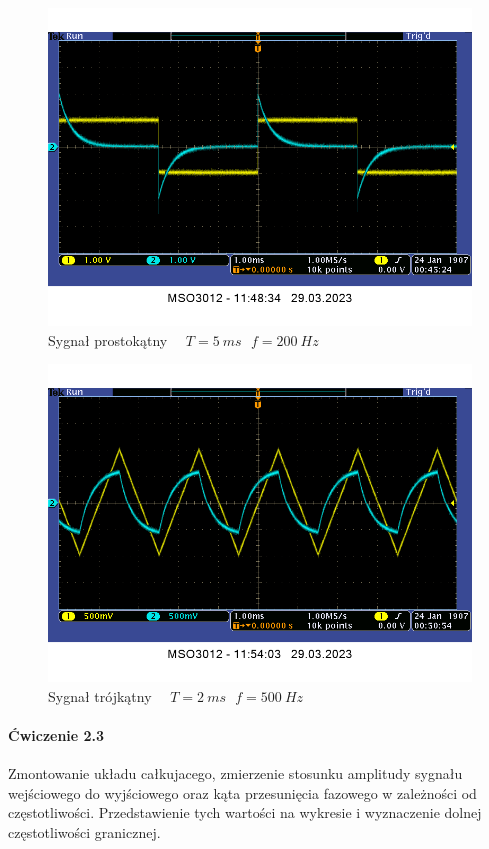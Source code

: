 \documentclass[14pt, table]{extarticle}
\begin{document}
\begin{figure}[H]
\includegraphics[scale=0.65]{CR-square-5ms}
\centering
\captionsetup{labelformat=empty}
\caption{Sygnał prostokątny \ \ $T = 5 \ ms \ \ \ f = 200 \ Hz$}
\end{figure}

\begin{figure}[H]
\includegraphics[scale=0.65]{CR-triangle}
\centering
\captionsetup{labelformat=empty}
\caption{Sygnał trójkątny \ \ $T = 2 \ ms \ \ \ f = 500 \ Hz$}
\end{figure}



\newpage
\paragraph{Ćwiczenie 2.3\\}
Zmontowanie układu całkujacego, zmierzenie stosunku amplitudy sygnału wejściowego do wyjściowego oraz kąta przesunięcia fazowego w zależności od częstotliwości. Przedstawienie tych wartości na wykresie i wyznaczenie dolnej częstotliwości granicznej.
\end{document}
